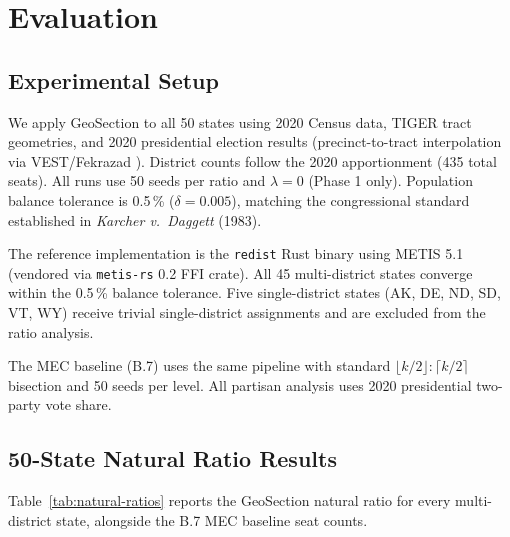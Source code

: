 \section{Evaluation}
\label{sec:evaluation}

\subsection{Experimental Setup}

We apply GeoSection to all 50 states using 2020 Census data, TIGER tract
geometries, and 2020 presidential election results
(precinct-to-tract interpolation via VEST/Fekrazad \citep{fekrazad2021}).
District counts follow the 2020 apportionment (435 total seats).
All runs use 50 seeds per ratio and $\lambda = 0$ (Phase 1 only).
Population balance tolerance is 0.5\,\% ($\delta = 0.005$), matching the
congressional standard established in \emph{Karcher v.\ Daggett} (1983).

The reference implementation is the \texttt{redist} Rust binary using
METIS 5.1 (vendored via \texttt{metis-rs} 0.2 FFI crate).
All 45 multi-district states converge within the 0.5\,\% balance tolerance.
Five single-district states (AK, DE, ND, SD, VT, WY) receive trivial
single-district assignments and are excluded from the ratio analysis.

The MEC baseline (B.7) uses the same pipeline with standard
$\lfloor k/2 \rfloor:\lceil k/2 \rceil$ bisection and 50 seeds per level.
All partisan analysis uses 2020 presidential two-party vote share.

\subsection{50-State Natural Ratio Results}
\label{sec:sweep}

Table~\ref{tab:natural-ratios} reports the GeoSection natural ratio for
every multi-district state, alongside the B.7 MEC baseline seat counts.

